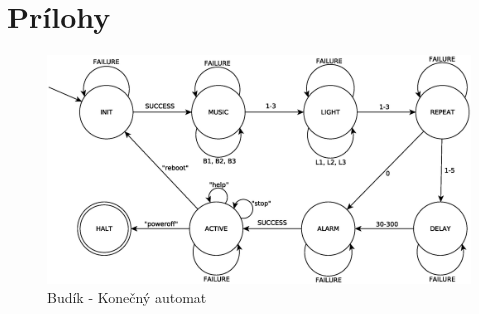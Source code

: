 \documentclass[11pt,a4paper]{article}
\begin{document}
\newpage
\section{Prílohy}

\begin{figure}[H]
    \centering
    \includegraphics[scale=0.55]{img/fsm.eps}
    \caption{Budík - Konečný automat}
    \label{fig:fsm}
\end{figure}

\newpage %

\makeatletter
\makeatother

\begin{flushleft}
    
\end{flushleft}
\end{document}
